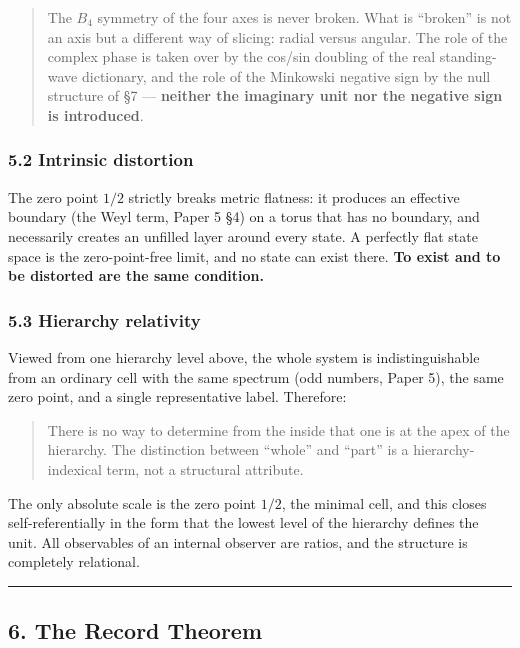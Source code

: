 \documentclass[
]{article}
\begin{document}
\begin{quote}
The \(B_4\) symmetry of the four axes is never broken. What is
``broken'' is not an axis but a different way of slicing: radial versus
angular. The role of the complex phase is taken over by the cos/sin
doubling of the real standing-wave dictionary, and the role of the
Minkowski negative sign by the null structure of §7 --- \textbf{neither
the imaginary unit nor the negative sign is introduced}.
\end{quote}

\subsubsection{5.2 Intrinsic distortion}\label{intrinsic-distortion}

The zero point \(1/2\) strictly breaks metric flatness: it produces an
effective boundary (the Weyl term, Paper 5 §4) on a torus that has no
boundary, and necessarily creates an unfilled layer around every state.
A perfectly flat state space is the zero-point-free limit, and no state
can exist there. \textbf{To exist and to be distorted are the same
condition.}

\subsubsection{5.3 Hierarchy relativity}\label{hierarchy-relativity}

Viewed from one hierarchy level above, the whole system is
indistinguishable from an ordinary cell with the same spectrum (odd
numbers, Paper 5), the same zero point, and a single representative
label. Therefore:

\begin{quote}
There is no way to determine from the inside that one is at the apex of
the hierarchy. The distinction between ``whole'' and ``part'' is a
hierarchy-indexical term, not a structural attribute.
\end{quote}

The only absolute scale is the zero point \(1/2\), the minimal cell, and
this closes self-referentially in the form that the lowest level of the
hierarchy defines the unit. All observables of an internal observer are
ratios, and the structure is completely relational.

\begin{center}\rule{0.5\linewidth}{0.5pt}\end{center}

\subsection{6. The Record Theorem}\label{the-record-theorem}
\end{document}
